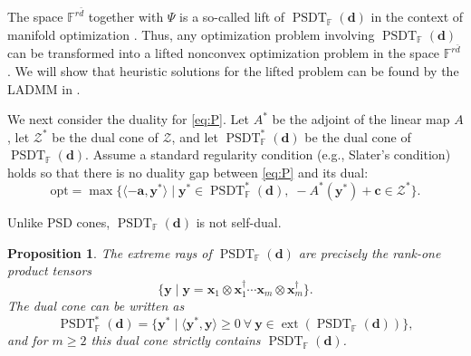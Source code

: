 \documentclass[smallextended]{svjour3}
\newtheorem{proposition}{Proposition}
\newcommand{\F}{\mathbb F}
\newcommand{\cZ}{\mathcal Z}
\DeclareMathOperator{\SOST}{PSDT}
\newcommand{\1}{\mathbf{1}}
\newcommand{\x}{\mathbf{x}}
\newcommand{\y}{\mathbf{y}}
\newcommand{\bc}{\mathbf{c}}
\renewcommand{\a}{\mathbf{a}}
\newcommand{\opt}{\text{opt}}
\DeclareMathOperator{\ext}{ext}
\DeclareMathOperator{\mtens}{\otimes}
\newcommand{\vc}[1]{\mathbf{#1}}
\newcommand{\vd}{\vc{d}}
\begin{document}
   The space $\F^{r\bar{d}}$ together with $\Psi$ is a so-called  lift of $\SOST_{\F}(\vd)$ in the context of manifold optimization \cite{levin2025effect}. Thus, any optimization problem involving $\SOST_{\F}(\vd)$ can be transformed into a lifted nonconvex optimization problem in the space $\F^{r\bar{d}}$. We will show that heuristic solutions for the lifted problem can be found by the LADMM in .

We next consider the duality for \eqref{eq:P}.
Let $A^*$ be the adjoint of the linear map $A$, let $\cZ^*$ be the dual cone of $\cZ$, and let $\SOST^*_{\F}(\vd)$ be the dual cone of $\SOST_{\F}(\vd)$. Assume a standard regularity condition (e.g., Slater's condition) holds so that there is no duality gap between \eqref{eq:P} and its dual:
    \begin{equation}
   \label{eq:D} \tag{DSDTO}
\opt = \max\{\langle -\a,\y^*\rangle \mid \y^* \in \SOST^*_{\F}(\vd),\; -A^*(\y^*)+\bc\in\cZ^*\}.
\end{equation}





Unlike PSD cones, $\SOST_{\F}(\vd)$ is not self-dual.
\begin{proposition}
    The extreme rays of $\SOST_{\F}(\vd)$ are precisely the rank-one product tensors
    \[\{\y\mid\y=\x_1\mtens\x_1^\dagger\cdots\x_m\mtens\x_m^\dagger\}.\]
    The dual cone can be written as
    \[\SOST^*_{\F}(\vd)=\{\y^*\mid\langle\y^*,\y\rangle\ge0\ \forall\ \y\in\ext(\SOST_{\F}(\vd))\},\]
    and for $m\ge2$ this dual cone strictly contains $\SOST_{\F}(\vd)$.
\end{proposition}
\end{document}
